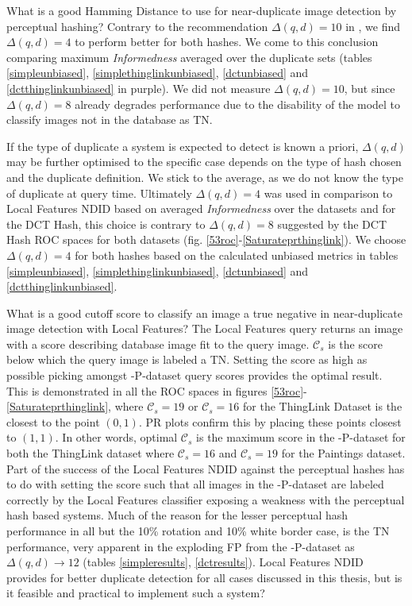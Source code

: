 \documentclass[english,12pt,a4paper,pdftex,elec,utf8, table]{aaltothesis}
\begin{document}
What is a good Hamming Distance to use for near-duplicate image detection by perceptual hashing? Contrary to the recommendation $\Delta(q,d)=10$ in \cite{Zauner2010}, we find $\Delta(q,d)=4$ to perform better for both hashes. We come to this conclusion comparing maximum \emph{Informedness} averaged over the duplicate sets (tables \ref{simpleunbiased}, \ref{simplethinglinkunbiased}, \ref{dctunbiased} and \ref{dctthinglinkunbiased} in purple). We did not measure $\Delta(q,d)=10$, but since $\Delta(q,d)=8$ already degrades performance due to the disability of the model to classify images not in the database as TN.

If the type of duplicate a system is expected to detect is known a priori, $\Delta(q,d)$ may be further optimised to the specific case depends on the type of hash chosen and the duplicate definition. We stick to the average, as we do not know the type of duplicate at query time. Ultimately $\Delta(q,d)=4$ was used in comparison to Local Features NDID based on averaged \emph{Informedness} over the datasets and for the DCT Hash, this choice is contrary to $\Delta(q,d)=8$ suggested by the DCT Hash ROC spaces for both datasets (fig. \ref{53roc}-\ref{Saturateprthinglink}). We choose $\Delta(q,d)=4$ for both hashes based on the calculated unbiased metrics in tables \ref{simpleunbiased}, \ref{simplethinglinkunbiased}, \ref{dctunbiased} and \ref{dctthinglinkunbiased}.

What is a good cutoff score to classify an image a true negative in near-duplicate image detection with Local Features? The Local Features query returns an image with a score describing database image fit to the query image. $\mathcal{C}_s$ is the score below which the query image is labeled a TN. Setting the score as high as possible picking amongst -P-dataset query scores provides the optimal result. This is demonstrated in all the ROC spaces in figures \ref{53roc}-\ref{Saturateprthinglink}, where $\mathcal{C}_s=19$ or $\mathcal{C}_s=16$ for the ThingLink Dataset is the closest to the point $(0, 1)$. PR plots confirm this by placing these points closest to $(1,1)$. In other words, optimal $\mathcal{C}_s$ is the maximum score in the -P-dataset for both the ThingLink dataset where $\mathcal{C}_s=16$ and $\mathcal{C}_s=19$ for the Paintings dataset. Part of the success of the Local Features NDID against the perceptual hashes has to do with setting the score such that all images in the -P-dataset are labeled correctly by the Local Features classifier exposing a weakness with the perceptual hash based systems. Much of the reason for the lesser perceptual hash performance in all but the 10\% rotation and 10\% white border case, is the TN performance, very apparent in the exploding FP from the -P-dataset as $\Delta(q,d)\rightarrow12$ (tables \ref{simpleresults}, \ref{dctresults}). Local Features NDID provides for better duplicate detection for all cases discussed in this thesis, but is it feasible and practical to implement such a system?
\end{document}
